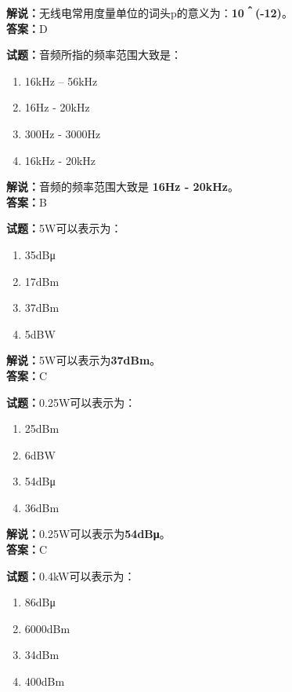 \documentclass{ctexbook}
\begin{document}
\noindent\textbf{解说：}无线电常用度量单位的词头p的意义为：\textbf{10＾(-12)}。\\\noindent\textbf{答案：}D


\bigskip


\noindent\textbf{试题：}音频所指的频率范围大致是：

\begin{enumerate}[leftmargin=3em]
	\item 16kHz – 56kHz
	\item 16Hz - 20kHz
	\item 300Hz - 3000Hz
	\item 16kHz - 20kHz
\end{enumerate}

\noindent\textbf{解说：}音频的频率范围大致是 \textbf{16Hz - 20kHz}。\\\noindent\textbf{答案：}B


\bigskip


\noindent\textbf{试题：}5W可以表示为：

\begin{enumerate}[leftmargin=3em]
	\item 35dBμ
	\item 17dBm
	\item 37dBm
	\item 5dBW
\end{enumerate}

\noindent\textbf{解说：}5W可以表示为\textbf{37dBm}。\\\noindent\textbf{答案：}C



\bigskip


\noindent\textbf{试题：}0.25W可以表示为：

\begin{enumerate}[leftmargin=3em]
	\item 25dBm
	\item 6dBW
	\item 54dBμ
	\item 36dBm
\end{enumerate}

\noindent\textbf{解说：}0.25W可以表示为\textbf{54dBμ}。\\\noindent\textbf{答案：}C



\bigskip


\noindent\textbf{试题：}0.4kW可以表示为：

\begin{enumerate}[leftmargin=3em]
	\item 86dBμ
	\item 6000dBm
	\item 34dBm
	\item 400dBm
\end{enumerate}
\end{document}

